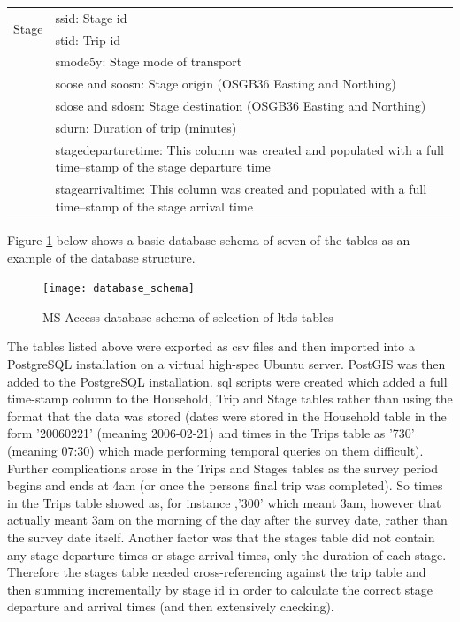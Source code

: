 \begin{center}
\begin{table}[h!]
\begin{tabular}{ | p{2.2cm} | p{12cm} |}
    \multirow{2}{*}{Stage} & ssid: Stage id \\
     & stid: Trip id \\
     & smode5y: Stage mode of transport \\
     & soose and soosn: Stage origin (OSGB36 Easting and Northing) \\
     & sdose and sdosn: Stage destination (OSGB36 Easting and Northing) \\
     & sdurn: Duration of trip (minutes) \\
     & stagedeparturetime: This column was created and populated with a full time--stamp of the stage departure time \\
     & stagearrivaltime: This column was created and populated with a full time--stamp of the stage arrival time \\ \hline
    \end{tabular}
    \label{tab:key_ltds_fields}
\end{table}
\end{center}

Figure \ref{fig:database_schema} below shows a basic database schema of seven of the tables as an example of the database structure.

\begin{figure}[H]
\centering
\texttt{[image: database\_schema]}
\caption{MS Access database schema of selection of \gls{ltds} tables}
\label{fig:database_schema}
\end{figure}

The tables listed above were exported as \gls{csv} files and then imported into a PostgreSQL installation on a virtual high-spec Ubuntu server. PostGIS was then added to the PostgreSQL installation. \gls{sql} scripts were created which added a full time-stamp column to the Household, Trip and Stage tables rather than using the format that the data was stored (dates were stored in the Household table in the form '20060221' (meaning 2006-02-21) and times in the Trips table as '730' (meaning 07:30) which made performing temporal queries on them difficult). Further complications arose in the Trips and Stages tables as the survey period begins and ends at 4am (or once the persons final trip was completed). So times in the Trips table showed as, for instance ,'300' which meant 3am, however that actually meant 3am on the morning of the day after the survey date, rather than the survey date itself. Another factor was that the stages table did not contain any stage departure times or stage arrival times, only the duration of each stage. Therefore the stages table needed cross-referencing against the trip table and then summing incrementally by stage id in order to calculate the correct stage departure and arrival times (and then extensively checking).


